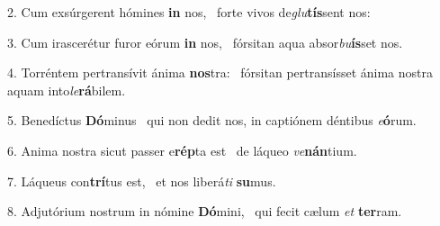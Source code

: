 2. Cum exsúrgerent hómines \textbf{in} nos, \ast\  forte vivos de\textit{glu}\textbf{tís}sent nos:\

3. Cum irascerétur furor eórum \textbf{in} nos, \ast\  fórsitan aqua absor\textit{bu}\textbf{ís}set nos.\

4. Torréntem pertransívit ánima \textbf{nos}tra: \ast\  fórsitan pertransísset ánima nostra aquam into\textit{le}\textbf{rá}bilem.\

5. Benedíctus \textbf{Dó}minus \ast\  qui non dedit nos, in captiónem déntibus \textit{e}\textbf{ó}rum.\

6. Anima nostra sicut passer e\textbf{rép}ta est \ast\  de láqueo \textit{ve}\textbf{nán}tium.\

7. Láqueus con\textbf{trí}tus est, \ast\  et nos liberá\textit{ti} \textbf{su}mus.\

8. Adjutórium nostrum in nómine \textbf{Dó}mini, \ast\  qui fecit cælum \textit{et} \textbf{ter}ram.\

